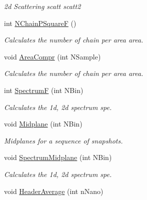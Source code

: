 \begin{DoxyCompactItemize}
\begin{DoxyCompactList}\small\item\em 2d \-Scattering  scatt scatt2 \end{DoxyCompactList}\item 
\hypertarget{classElPoly_afe2c794cc4f62f2e547526f63e82acfe}{int \hyperlink{classElPoly_afe2c794cc4f62f2e547526f63e82acfe}{\-N\-Chain\-P\-Square\-F} ()}\label{classElPoly_afe2c794cc4f62f2e547526f63e82acfe}

\begin{DoxyCompactList}\small\item\em \-Calculates the number of chain per area  area. \end{DoxyCompactList}\item 
void \hyperlink{classElPoly_afbe805e551084aebeee2c673c9b3937a}{\-Area\-Compr} (int \-N\-Sample)
\begin{DoxyCompactList}\small\item\em \-Calculates the number of chain per area  area. \end{DoxyCompactList}\item 
\hypertarget{classElPoly_ada953db0b772595339ef925b5dbd8c62}{int \hyperlink{classElPoly_ada953db0b772595339ef925b5dbd8c62}{\-Spectrum\-F} (int \-N\-Bin)}\label{classElPoly_ada953db0b772595339ef925b5dbd8c62}

\begin{DoxyCompactList}\small\item\em \-Calculates the 1d, 2d spectrum  spe. \end{DoxyCompactList}\item 
\hypertarget{classElPoly_a16156b6e530ecc6df93b6ffd3c229f1b}{void \hyperlink{classElPoly_a16156b6e530ecc6df93b6ffd3c229f1b}{\-Midplane} (int \-N\-Bin)}\label{classElPoly_a16156b6e530ecc6df93b6ffd3c229f1b}

\begin{DoxyCompactList}\small\item\em \-Midplanes for a sequence of snapshots. \end{DoxyCompactList}\item 
\hypertarget{classElPoly_a669491e5e5c66f665694c9d8908d3109}{void \hyperlink{classElPoly_a669491e5e5c66f665694c9d8908d3109}{\-Spectrum\-Midplane} (int \-N\-Bin)}\label{classElPoly_a669491e5e5c66f665694c9d8908d3109}

\begin{DoxyCompactList}\small\item\em \-Calculates the 1d, 2d spectrum  spe. \end{DoxyCompactList}\item 
\hypertarget{classElPoly_a2eab2da94941b822d51d4e21bfe64aef}{void \hyperlink{classElPoly_a2eab2da94941b822d51d4e21bfe64aef}{\-Header\-Average} (int n\-Nano)}\label{classElPoly_a2eab2da94941b822d51d4e21bfe64aef}


\end{DoxyCompactItemize}
